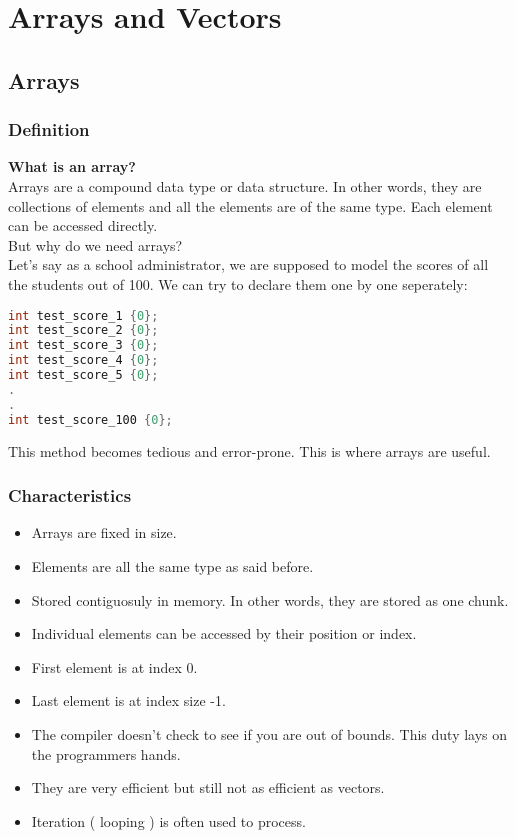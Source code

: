 \chapter{Arrays and Vectors}
\section{Arrays}
\subsection{Definition}
\textbf{What is an array?}\\
Arrays are a compound data type or data structure. In other words, they are collections of elements and all the elements are of the same type. Each element can be accessed directly.\\
But why do we need arrays?\\
Let's say as a school administrator, we are supposed to model the scores of all the students out of 100. We can try to declare them one by one seperately:

\begin{lstlisting}[language=c]
int test_score_1 {0};
int test_score_2 {0};
int test_score_3 {0};
int test_score_4 {0};
int test_score_5 {0};
.
.
int test_score_100 {0};
\end{lstlisting}
This method becomes tedious and error-prone. This is where arrays are useful.
\subsection{Characteristics}
\begin{itemize}
    \item Arrays are fixed in size.
    \item Elements are all the same type as said before.
    \item Stored contiguosuly in memory. In other words, they are stored as one chunk.
    \item Individual elements can be accessed by their position or index.
    \item First element is at index 0.
    \item Last element is at index size -1.
    \item The compiler doesn't check to see if you are out of bounds. This duty lays on the programmers hands. 
    \item They are very efficient but still not as efficient as vectors. 
    \item Iteration ( looping ) is often used to process. 
\end{itemize}

